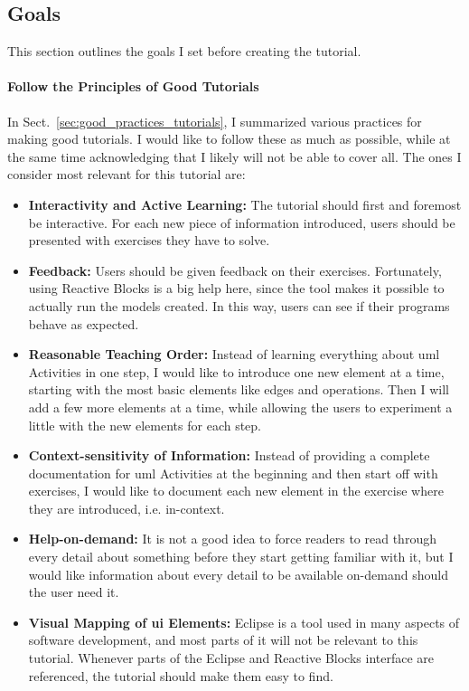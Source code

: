 \subsection{Goals}
\label{sec:tutorial_goals}
This section outlines the goals I set before creating the tutorial.

\paragraph{Follow the Principles of Good Tutorials} In Sect.~\ref{sec:good_practices_tutorials}, I summarized various practices for making good tutorials. I would like to follow these as much as possible, while at the same time acknowledging that I likely will not be able to cover all. The ones I consider most relevant for this tutorial are:

\begin{itemize}
	\item{\textbf{Interactivity and Active Learning:}} The tutorial should first and foremost be interactive. For each new piece of information introduced, users should be presented with exercises they have to solve.
	\item{\textbf{Feedback:}} Users should be given feedback on their exercises. Fortunately, using Reactive Blocks is a big help here, since the tool makes it possible to actually run the models created. In this way, users can see if their programs behave as expected.
	\item{\textbf{Reasonable Teaching Order:}} Instead of learning everything about \gls{uml} Activities in one step, I would like to introduce one new element at a time, starting with the most basic elements like edges and operations. Then I will add a few more elements at a time, while allowing the users to experiment a little with the new elements for each step.
	\item{\textbf{Context-sensitivity of Information:}} Instead of providing a complete documentation for \gls{uml} Activities at the beginning and then start off with exercises, I would like to document each new element in the exercise where they are introduced, i.e. in-context.
	\item{\textbf{Help-on-demand:}} It is not a good idea to force readers to read through every detail about something before they start getting familiar with it, but I would like information about every detail to be available on-demand should the user need it.
	\item{\textbf{Visual Mapping of \gls{ui} Elements:}} Eclipse is a tool used in many aspects of software development, and most parts of it will not be relevant to this tutorial. Whenever parts of the Eclipse and Reactive Blocks interface are referenced, the tutorial should make them easy to find.

\end{itemize}
